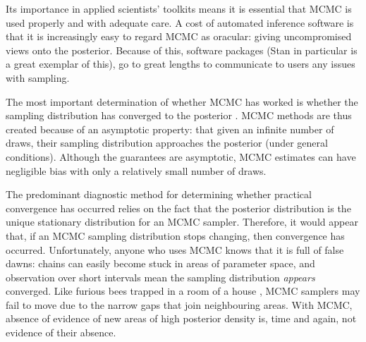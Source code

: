 \documentclass{article}
\begin{document}
Its importance in applied scientists' toolkits means it is essential that MCMC is used properly and with adequate care. A cost of automated inference software is that it is increasingly easy to regard MCMC as oracular: giving uncompromised views onto the posterior. Because of this, software packages (Stan in particular \citep{carpenter2017stan} is a great exemplar of this), go to great lengths to communicate to users any issues with sampling.


The most important determination of whether MCMC has worked is whether the sampling distribution has converged to the posterior \citep{brooks2011handbook}. MCMC methods are thus created because of an asymptotic property: that given an infinite number of draws, their sampling distribution approaches the posterior (under general conditions). Although the guarantees are asymptotic, MCMC estimates can have negligible bias with only a relatively small number of draws.

The predominant diagnostic method for determining whether practical convergence has occurred relies on the fact that the posterior distribution is the unique stationary distribution for an MCMC sampler. Therefore, it would appear that, if an MCMC sampling distribution stops changing, then convergence has occurred. Unfortunately, anyone who uses MCMC knows that it is full of false dawns: chains can easily become stuck in areas of parameter space, and observation over short intervals mean the sampling distribution \textit{appears} converged. Like furious bees trapped in a room of a house \citep{lambertbees}, MCMC samplers may fail to move due to the narrow gaps that join neighbouring areas. With MCMC, absence of evidence of new areas of high posterior density is, time and again, not evidence of their absence.
\end{document}
